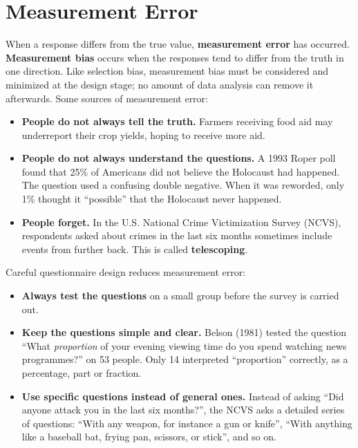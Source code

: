 \documentclass[
  letterpaper,
  DIV=11,
  numbers=noendperiod]{scrreprt}
\providecommand{\tightlist}{%
  \setlength{\itemsep}{0pt}\setlength{\parskip}{0pt}}
\renewcommand{\[}{\begin{equation}}
\renewcommand{\]}{\end{equation}}
\begin{document}
\section{Measurement Error}\label{sec-intro-measurement-error}

When a response differs from the true value, \textbf{measurement error}
has occurred. \textbf{Measurement bias} occurs when the responses tend
to differ from the truth in one direction. Like selection bias,
measurement bias must be considered and minimized at the design stage;
no amount of data analysis can remove it afterwards. Some sources of
measurement error:

\begin{itemize}
\tightlist
\item
  \textbf{People do not always tell the truth.} Farmers receiving food
  aid may underreport their crop yields, hoping to receive more aid.
\item
  \textbf{People do not always understand the questions.} A 1993 Roper
  poll found that 25\% of Americans did not believe the Holocaust had
  happened. The question used a confusing double negative. When it was
  reworded, only 1\% thought it ``possible'' that the Holocaust never
  happened.
\item
  \textbf{People forget.} In the U.S. National Crime Victimization
  Survey (NCVS), respondents asked about crimes in the last six months
  sometimes include events from further back. This is called
  \textbf{telescoping}.
\end{itemize}

Careful questionnaire design reduces measurement error:

\begin{itemize}
\tightlist
\item
  \textbf{Always test the questions} on a small group before the survey
  is carried out.
\item
  \textbf{Keep the questions simple and clear.} Belson (1981) tested the
  question ``What \emph{proportion} of your evening viewing time do you
  spend watching news programmes?'' on 53 people. Only 14 interpreted
  ``proportion'' correctly, as a percentage, part or fraction.
\item
  \textbf{Use specific questions instead of general ones.} Instead of
  asking ``Did anyone attack you in the last six months?'', the NCVS
  asks a detailed series of questions: ``With any weapon, for instance a
  gun or knife'', ``With anything like a baseball bat, frying pan,
  scissors, or stick'', and so on.
\end{itemize}
\end{document}
